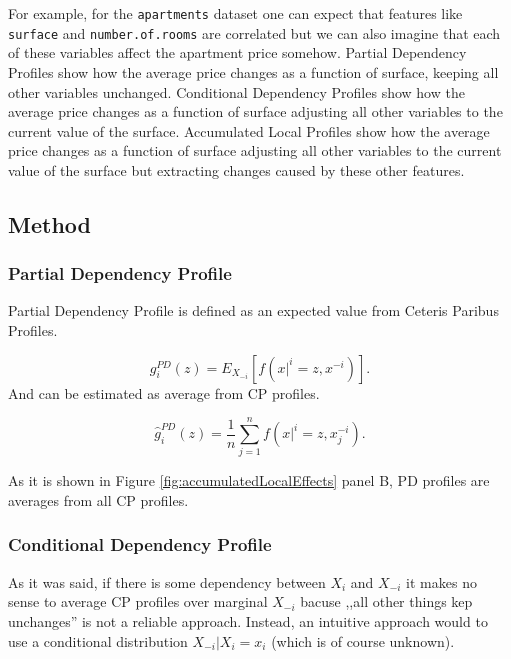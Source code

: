 \documentclass[12pt,]{krantz}
\begin{document}
For example, for the \texttt{apartments} dataset one can expect that features like \texttt{surface} and \texttt{number.of.rooms} are correlated but we can also imagine that each of these variables affect the apartment price somehow. Partial Dependency Profiles show how the average price changes as a function of surface, keeping all other variables unchanged. Conditional Dependency Profiles show how the average price changes as a function of surface adjusting all other variables to the current value of the surface. Accumulated Local Profiles show how the average price changes as a function of surface adjusting all other variables to the current value of the surface but extracting changes caused by these other features.

\hypertarget{ALPMethod}{%
\subsection{Method}\label{ALPMethod}}

\hypertarget{partial-dependency-profile}{%
\subsubsection{Partial Dependency Profile}\label{partial-dependency-profile}}

Partial Dependency Profile is defined as an expected value from Ceteris Paribus Profiles.

\[
g^{PD}_i(z) = E_{X_{-i}}[ f(x|^i = z, x^{-i}) ].
\]
And can be estimated as average from CP profiles.

\[
\hat g^{PD}_i(z) = \frac{1}{n} \sum_{j=1}^{n} f(x|^i = z, x_j^{-i}).
\]

As it is shown in Figure \ref{fig:accumulatedLocalEffects} panel B, PD profiles are averages from all CP profiles.

\hypertarget{conditional-dependency-profile}{%
\subsubsection{Conditional Dependency Profile}\label{conditional-dependency-profile}}

As it was said, if there is some dependency between \(X_i\) and \(X_{-i}\) it makes no sense to average CP profiles over marginal \(X_{-i}\) bacuse ,,all other things kep unchanges'' is not a reliable approach.
Instead, an intuitive approach would to use a conditional distribution \(X_{-i}|X_i=x_i\) (which is of course unknown).
\end{document}
